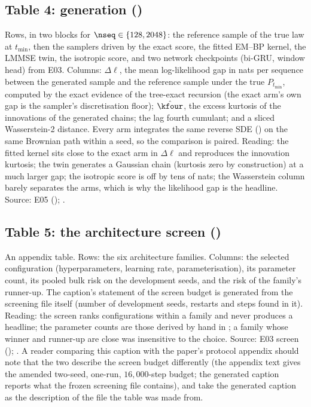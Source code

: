 \subsection{Table 4: generation ()}

Rows, in two blocks for $\nseq\in\{128,2048\}$: the reference sample of the true law at
$t_{\min}$, then the samplers driven by the exact score, the fitted EM--BP kernel, the
LMMSE twin, the isotropic score, and two network checkpoints (bi-GRU, window head) from
E03. Columns: $\Delta\ell$, the mean log-likelihood gap in nats per sequence between the
generated sample and the reference sample under the true $P_{t_{\min}}$, computed by
the exact evidence of the tree-exact recursion (the exact arm's own gap is the sampler's
discretisation floor); $\hat\kfour$, the excess kurtosis of the innovations of the
generated chains; the lag fourth cumulant; and a sliced Wasserstein-2 distance. Every arm
integrates the same reverse SDE () on the same Brownian
path within a seed, so the comparison is paired. Reading: the fitted kernel sits close to
the exact arm in $\Delta\ell$ and reproduces the innovation kurtosis; the twin generates a
Gaussian chain (kurtosis zero by construction) at a much larger gap; the isotropic score
is off by tens of nats; the Wasserstein column barely separates the arms, which is why
the likelihood gap is the headline. Source: E05 ();
.

\subsection{Table 5: the architecture screen ()}

An appendix table. Rows: the six architecture families. Columns: the selected
configuration (hyperparameters, learning rate, parameterisation), its parameter count,
its pooled bulk risk on the development seeds, and the risk of the family's runner-up.
The caption's statement of the screen budget is generated from the screening file
itself (number of development seeds, restarts and steps found in it). Reading: the
screen ranks configurations within a family and never produces a headline; the
parameter counts are those derived by hand in ; a family
whose winner and runner-up are close was insensitive to the choice. Source: E03 screen
(); . A reader
comparing this caption with the paper's protocol appendix should note that the two
describe the screen budget differently (the appendix text gives the amended two-seed,
one-run, $16{,}000$-step budget; the generated caption reports what the frozen screening
file contains), and take the generated caption as the description of the file the
table was made from.

